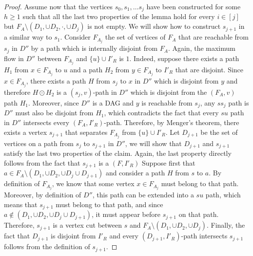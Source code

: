 \documentclass[utf8,11pt]{article}
\theoremstyle{plain}
\theoremstyle{definition}
\begin{document}
\begin{proof}
    Assume now that the vertices $s_0, s_1, \dots s_j$ have been constructed for some $h \geq 1$ such that all the last two properties of the lemma hold for every $i \in [j]$ but $F_A \setminus (D_1, \cup D_2, \cdot, \cup D_{j})$ is not empty.  We will show how to construct $s_{j+1}$ in a similar way to $s_1$. Consider $F_{A_j}$ the set of vertices of $F_A$ that are reachable from $s_j$ in $D''$ by a path which is internally disjoint from $F_A$. Again, the maximum flow in $D''$ between $F_{A_j}$ and $\{u\} \cup I'_R$ is $1$. Indeed, suppose there exists a path $H_1$ from $x \in F_{A_j}$ to $u$ and a path $H_2$ from $y \in F_{A_j}$ to $I'_R$ that are disjoint. Since $x \in F_{A_j}$, there exists a path $H$ from $s_j$ to $x$ in $D''$ which is  disjoint from $y$ and therefore $H \odot H_2$ is a $(s_j,v)$-path in $D''$ which is disjoint from the $(F_A,v)$ path $H_1$. Moreover, since $D''$ is a DAG and $y$ is reachable from $s_j$, any $ss_j$ path is $D''$ must also be disjoint from $H_1$, which contradicts the fact that every $su$ path in $D''$ intersects every $(F_A,I'_R)$-path. Therefore, by Menger's theorem, there exists a vertex $s_{j+1}$ that separates $F_{A_j}$ from $\{u\} \cup I'_R$. Let $D_{j+1}$ be the set of vertices on a path from $s_j$ to $s_{j+1}$ in $D''$, we will show that $D_{j+1}$ and $s_{j+1}$ satisfy the last two properties of the claim. Again, the last property directly follows from the fact that $s_{j+1}$ is a $(F, I'_R)$ Suppose first that $a \in F_A \setminus (D_1, \cup D_2, \cup D_{j} \cup D_{j+1})$ and consider a path $H$ from $s$ to $a$. By definition of $F_{A_j}$, we know that some vertex $x \in F_{A_j}$ must belong to that path. Moreover, by definition of $D''$, this path can be extended into a $su$ path, which means that $s_{j+1}$ must belong to that path, and since $a \not \in (D_1, \cup D_2, \cup D_{j} \cup D_{j+1})$, it must appear before $s_{j+1}$ on that path. Therefore, $s_{j+1}$ is a vertex cut between $s$ and $F_A \setminus (D_1, \cup D_2, \cup D_{j})$. Finally, the fact that $D_{j+1}$ is disjoint from $I'_R$ and every $(D_{j+1},I'_R)$-path intersects $s_{j+1}$ follows from the definition of $s_{j+1}$.
\end{proof}
\end{document}
